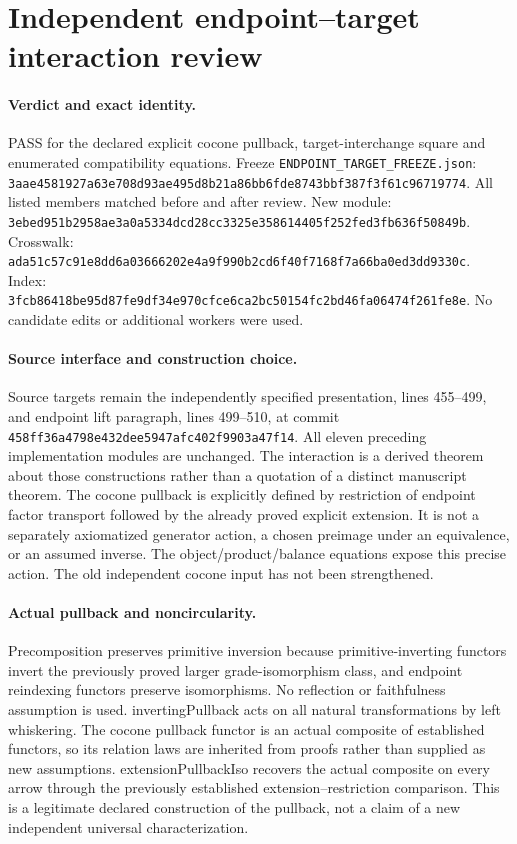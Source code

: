 \documentclass{article}
\begin{document}
\section*{Independent endpoint--target interaction review}
\paragraph{Verdict and exact identity.} PASS for the declared explicit cocone pullback, target-interchange square and enumerated compatibility equations. Freeze \texttt{ENDPOINT\_TARGET\_FREEZE.json}: \texttt{3aae4581927a63e708d93ae495d8b21a86bb6fde8743bbf387f3f61c96719774}. All listed members matched before and after review. New module: \texttt{3ebed951b2958ae3a0a5334dcd28cc3325e358614405f252fed3fb636f50849b}. Crosswalk: \texttt{ada51c57c91e8dd6a03666202e4a9f990b2cd6f40f7168f7a66ba0ed3dd9330c}. Index: \texttt{3fcb86418be95d87fe9df34e970cfce6ca2bc50154fc2bd46fa06474f261fe8e}. No candidate edits or additional workers were used.
\paragraph{Source interface and construction choice.} Source targets remain the independently specified presentation, lines 455--499, and endpoint lift paragraph, lines 499--510, at commit \texttt{458ff36a4798e432dee5947afc402f9903a47f14}. All eleven preceding implementation modules are unchanged. The interaction is a derived theorem about those constructions rather than a quotation of a distinct manuscript theorem. The cocone pullback is explicitly defined by restriction of endpoint factor transport followed by the already proved explicit extension. It is not a separately axiomatized generator action, a chosen preimage under an equivalence, or an assumed inverse. The object/product/balance equations expose this precise action. The old independent cocone input has not been strengthened.
\paragraph{Actual pullback and noncircularity.} Precomposition preserves primitive inversion because primitive-inverting functors invert the previously proved larger grade-isomorphism class, and endpoint reindexing functors preserve isomorphisms. No reflection or faithfulness assumption is used. invertingPullback acts on all natural transformations by left whiskering. The cocone pullback functor is an actual composite of established functors, so its relation laws are inherited from proofs rather than supplied as new assumptions. extensionPullbackIso recovers the actual composite on every arrow through the previously established extension--restriction comparison. This is a legitimate declared construction of the pullback, not a claim of a new independent universal characterization.
\end{document}
